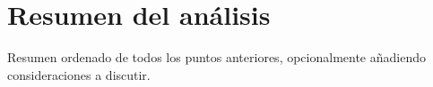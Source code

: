 \section{Resumen del análisis}
\label{sec:analysisResume}

\begin{shaded}
Resumen ordenado de todos los puntos anteriores, opcionalmente añadiendo consideraciones a discutir.
\end{shaded}